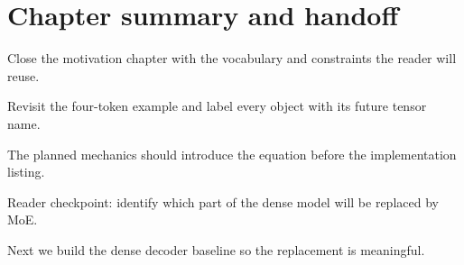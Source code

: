 \section{Chapter summary and handoff}
\label{sec:ch01-chapter-summary-and-handoff}

Close the motivation chapter with the vocabulary and constraints the reader will reuse.



Revisit the four-token example and label every object with its future tensor name.



The planned mechanics should introduce the equation before the implementation listing.





\begin{checkpointbox}
Reader checkpoint: identify which part of the dense model will be replaced by MoE.
\end{checkpointbox}

Next we build the dense decoder baseline so the replacement is meaningful.
